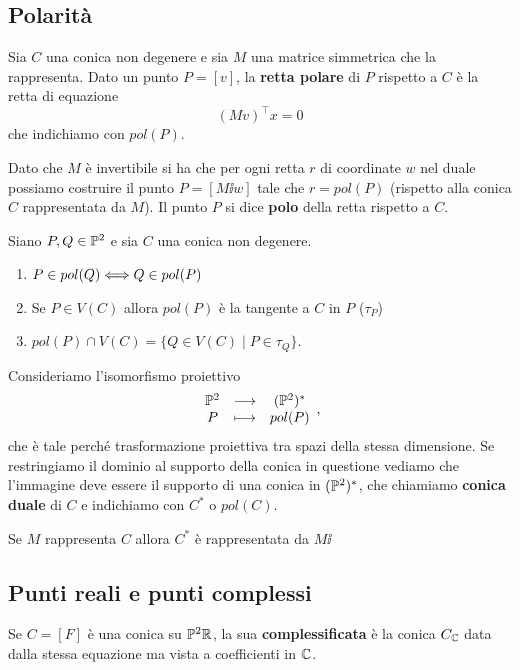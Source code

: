 \begin{multicols*}{2}
    \subsection{Polarit\`a}
    \begin{definition}
    Sia $C$ una conica non degenere e sia $M$ una matrice simmetrica che la rappresenta. Dato un punto $P=[v]$, la \textbf{retta polare} di $P$ rispetto a $C$ \`e la retta di equazione
    \[(Mv)^\top x=0\]
    che indichiamo con $pol(P)$.
    \end{definition}
    \begin{remark}
    Dato che $M$ \`e invertibile si ha che per ogni retta $r$ di coordinate $w$ nel duale possiamo costruire il punto $P=[M\ii w]$ tale che $r=pol(P)$ (rispetto alla conica $C$ rappresentata da $M$). Il punto $P$ si dice \textbf{polo} della retta rispetto a $C$.
    \end{remark}

    \begin{proposition}
    Siano $P,Q\in\mathbb{P}^2$ e sia $C$ una conica non degenere.
    \begin{enumerate}
    \item $P\in pol(Q)\Longleftrightarrow Q\in pol(P)$
    \item Se $P\in V(C)$ allora $pol(P)$ \`e la tangente a $C$ in $P$ ($\tau_P$)
    \item $pol(P)\cap V(C)=\{Q\in V(C)\mid P\in \tau_Q\}$.
    \end{enumerate}
    \end{proposition}

    \begin{definition}
    Consideriamo l'isomorfismo proiettivo
    \[\begin{array}{ccc} {\mathbb{P}^2} & \longrightarrow & {(\mathbb{P}^2)^\ast}\\ {P} & \longmapsto & {pol(P)} \end{array},\]
    che \`e tale perch\'e trasformazione proiettiva tra spazi della stessa dimensione.
    Se restringiamo il dominio al supporto della conica in questione vediamo che l'immagine deve essere il supporto di una conica in $(\mathbb{P}^2)^\ast$, che chiamiamo \textbf{conica duale} di $C$ e indichiamo con $C^\ast$ o $pol(C)$.
    \end{definition}
    \begin{remark}
    Se $M$ rappresenta $C$ allora $C^\ast$ \`e rappresentata da $M\ii$
    \end{remark}

    \subsection{Punti reali e punti complessi}
    \begin{definition}[Complessificazione]
    Se $C=[F]$ \`e una conica su $\mathbb{P}^2\mathbb{R}$, la sua \textbf{complessificata} \`e la conica $C_{\mathbb{C}}$ data dalla stessa equazione ma vista a coefficienti in $\mathbb{C}$.
    \end{definition}


\end{multicols*}
